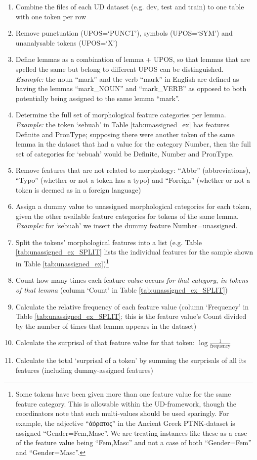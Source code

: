 \documentclass[USenglish]{article}
\begin{document}
\begin{enumerate}
\item Combine the files of each UD dataset (e.g. dev, test and train) to one table with one token per row
\item Remove punctuation (UPOS=`PUNCT'), symbols (UPOS=`SYM') and unanalysable tokens (UPOS=`X')
\item Define lemmas as a combination of lemma + UPOS, so that lemmas that are spelled the same but belong to different UPOS can be distinguished. \textit{Example:} the noun ``mark'' and the verb ``mark'' in English are defined as having the lemmas ``mark\_NOUN'' and ``mark\_VERB'' as opposed to both potentially being assigned to the same lemma ``mark''.
\item Determine the full set of morphological feature categories per lemma. \textit{Example:} the token `sebuah' in Table \ref{tab:unassigned_ex} has features Definite and PronType; supposing there were another token of the same lemma in the dataset that had a value for the category Number, then the full set of categories for `sebuah' would be Definite, Number and PronType.
\item Remove features that are not related to morphology: ``Abbr'' (abbreviations), ``Typo'' (whether or not a token has a typo) and ``Foreign'' (whether or not a token is deemed as in a foreign language)
\item Assign a dummy value to unassigned morphological categories for each token, given the other available feature categories for tokens of the same lemma. \textit{Example:} for `sebuah' we insert the dummy feature Number=unassigned.
\item Split the tokens' morphological features into a list (e.g. Table \ref{tab:unassigned_ex_SPLIT} lists the individual features for the sample shown in Table \ref{tab:unassigned_ex})\footnote{Some tokens have been given more than one feature value for the same feature category. This is allowable within the UD-framework, though the coordinators note that such multi-values should be used sparingly. For example, the adjective ``{\dolousfont ἀ}{\Timesfont όρατος}'' in the Ancient Greek PTNK-dataset is assigned ``Gender=Fem,Masc''. We are treating instances like these as a case of the feature value being ``Fem,Masc'' and not a case of both ``Gender=Fem'' and ``Gender=Masc''.}
\item Count how many times each feature \textit{value} occurs \textit{for that category, in tokens of that lemma} (column `Count' in Table \ref{tab:unassigned_ex_SPLIT})
\item Calculate the relative frequency of each feature value (column `Frequency' in Table \ref{tab:unassigned_ex_SPLIT}; this is the feature value's Count divided by the number of times that lemma appears in the dataset)
\item Calculate the surprisal of that feature value for that token: $\log{\frac{1}{\text{frequency}}}$
\item Calculate the total `surprisal of a token' by summing the surprisals of all its features (including dummy-assigned features)


\end{enumerate}
\end{document}
